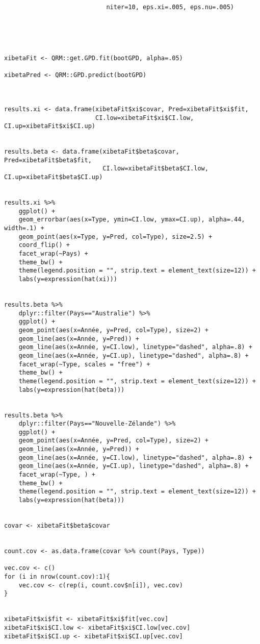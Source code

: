 \begin{lstlisting}
                            niter=10, eps.xi=.005, eps.nu=.005)





xibetaFit <- QRM::get.GPD.fit(bootGPD, alpha=.05) 

xibetaPred <- QRM::GPD.predict(bootGPD)



results.xi <- data.frame(xibetaFit$xi$covar, Pred=xibetaFit$xi$fit,
                         CI.low=xibetaFit$xi$CI.low, CI.up=xibetaFit$xi$CI.up)


results.beta <- data.frame(xibetaFit$beta$covar, Pred=xibetaFit$beta$fit,
                           CI.low=xibetaFit$beta$CI.low, CI.up=xibetaFit$beta$CI.up)


results.xi %>% 
    ggplot() + 
    geom_errorbar(aes(x=Type, ymin=CI.low, ymax=CI.up), alpha=.44, width=.1) +
    geom_point(aes(x=Type, y=Pred, col=Type), size=2.5) + 
    coord_flip() + 
    facet_wrap(~Pays) + 
    theme_bw() + 
    theme(legend.position = "", strip.text = element_text(size=12)) + 
    labs(y=expression(hat(xi)))


results.beta %>% 
    dplyr::filter(Pays=="Australie") %>% 
    ggplot() + 
    geom_point(aes(x=Année, y=Pred, col=Type), size=2) + 
    geom_line(aes(x=Année, y=Pred)) + 
    geom_line(aes(x=Année, y=CI.low), linetype="dashed", alpha=.8) + 
    geom_line(aes(x=Année, y=CI.up), linetype="dashed", alpha=.8) + 
    facet_wrap(~Type, scales = "free") + 
    theme_bw() + 
    theme(legend.position = "", strip.text = element_text(size=12)) + 
    labs(y=expression(hat(beta)))
    

results.beta %>% 
    dplyr::filter(Pays=="Nouvelle-Zélande") %>% 
    ggplot() + 
    geom_point(aes(x=Année, y=Pred, col=Type), size=2) + 
    geom_line(aes(x=Année, y=Pred)) + 
    geom_line(aes(x=Année, y=CI.low), linetype="dashed", alpha=.8) + 
    geom_line(aes(x=Année, y=CI.up), linetype="dashed", alpha=.8) + 
    facet_wrap(~Type, ) + 
    theme_bw() + 
    theme(legend.position = "", strip.text = element_text(size=12)) + 
    labs(y=expression(hat(beta)))
    
    
covar <- xibetaFit$beta$covar 


count.cov <- as.data.frame(covar %>% count(Pays, Type))

vec.cov <- c()
for (i in nrow(count.cov):1){
    vec.cov <- c(rep(i, count.cov$n[i]), vec.cov)
}


xibetaFit$xi$fit <- xibetaFit$xi$fit[vec.cov]
xibetaFit$xi$CI.low <- xibetaFit$xi$CI.low[vec.cov]
xibetaFit$xi$CI.up <- xibetaFit$xi$CI.up[vec.cov]


\end{lstlisting}
